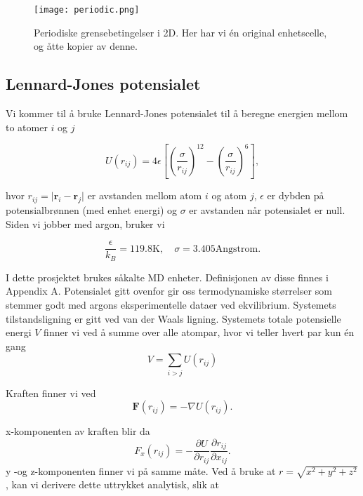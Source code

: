\documentclass[paper=a4, fontsize=11pt]{scrartcl} %
\numberwithin{equation}{section} %
\numberwithin{figure}{section} %
\numberwithin{table}{section} %
\begin{document}
\FloatBarrier
\begin{figure}[!ht]
 \centering
 \texttt{[image: periodic.png]}
 \caption{Periodiske grensebetingelser i 2D. Her har vi én original enhetscelle, og åtte kopier av denne.}
 \label{per}
 \end{figure}
 \FloatBarrier
 
 
\subsection{Lennard-Jones potensialet}
Vi kommer til å bruke Lennard-Jones potensialet til å beregne energien mellom to atomer $i$ og $j$

\begin{equation}
U(r_{ij}) = 4\epsilon\left[\left(\frac{\sigma}{r_{ij}}\right)^{12} - \left(\frac{\sigma}{r_{ij}}\right)^6\right],
\end{equation}

hvor $r_{ij} = \vert\mathbf{r}_i - \mathbf{r}_j\vert$  er avstanden mellom atom $i$ og atom $j$, $\epsilon$ er dybden på potensialbrønnen (med enhet energi) og $\sigma$ er avstanden når potensialet er null. Siden vi jobber med argon, bruker vi 

\begin{equation}
	\frac{\epsilon}{k_B} = 119.8\mathrm{K}, \quad \sigma=3.405 \mathrm{Angstrom}.
\end{equation}

I dette prosjektet brukes såkalte MD enheter. Definisjonen av disse finnes i Appendix A. Potensialet gitt ovenfor gir oss termodynamiske størrelser som stemmer godt med argons eksperimentelle dataer ved ekvilibrium. Systemets tilstandsligning er gitt ved van der Waals ligning. Systemets totale potensielle energi $V$ finner vi ved å summe over alle atompar, hvor vi teller hvert par kun én gang
\begin{equation}
V = \sum_{i>j} U(r_{ij})
\end{equation}

Kraften finner vi ved
\begin{equation}
\textbf{F}(r_{ij}) = - \nabla U(r_{ij}).
\end{equation}

x-komponenten av kraften blir da
\begin{equation}
F_x (r_{ij}) = -\frac{\partial U}{\partial r_{ij}} \frac{\partial r_{ij}}{\partial x_{ij}}.
\end{equation}
y -og z-komponenten finner vi på samme måte. Ved å bruke at $r = \sqrt{x^2 + y^2 + z^2}$, kan vi  derivere dette uttrykket analytisk, slik at 
\end{document}
